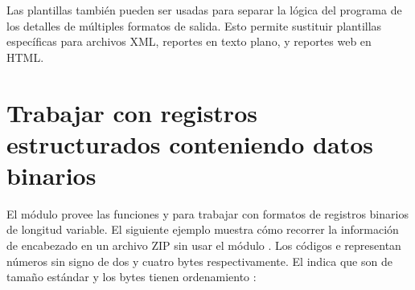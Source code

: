 \documentclass[a5paper,10pt,spanish]{sphinxmanual}
\begin{document}
\begin{sphinxVerbatim}[commandchars=\\\{\}]
\end{sphinxVerbatim}

\sphinxAtStartPar
Las plantillas también pueden ser usadas para separar la lógica del programa de los detalles de múltiples formatos de salida.  Esto permite sustituir plantillas específicas para archivos XML, reportes en texto plano, y reportes web en HTML.


\section{Trabajar con registros estructurados conteniendo datos binarios}
\label{\detokenize{tutorial/stdlib2:working-with-binary-data-record-layouts}}\label{\detokenize{tutorial/stdlib2:tut-binary-formats}}
\sphinxAtStartPar
El módulo  provee las funciones  y  para trabajar con formatos de registros binarios de longitud variable.  El siguiente ejemplo muestra cómo recorrer la información de encabezado en un archivo ZIP sin usar el módulo .  Los códigos  e  representan números sin signo de dos y cuatro bytes respectivamente.  El  indica que son de tamaño estándar y los bytes tienen ordenamiento :
\end{document}
